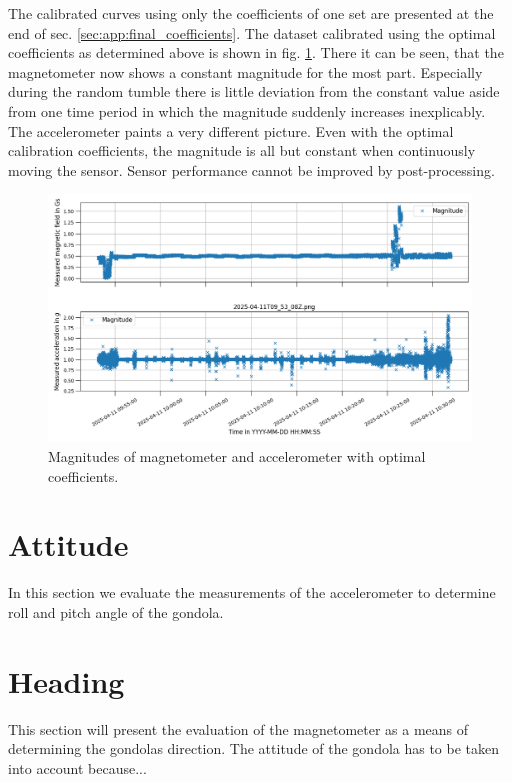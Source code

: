 The calibrated curves using only the coefficients of one set are presented at the end of sec. \ref{sec:app:final_coefficients}. The dataset calibrated using the optimal coefficients as determined above is shown in fig. \ref{fig:res:optimal_coeff_magnitude}. There it can be seen, that the magnetometer now shows a constant magnitude for the most part. Especially during the random tumble there is little deviation from the constant value aside from one time period in which the magnitude suddenly increases inexplicably.\\
The accelerometer paints a very different picture. Even with the optimal calibration coefficients, the magnitude is all but constant when continuously moving the sensor. Sensor performance cannot be improved by post-processing.  
\begin{figure}[H]
    \centering
    \includegraphics[width=\linewidth]{images/04_results/optimal_calibrated_11apr_magnitude.png}
    \caption{Magnitudes of magnetometer and accelerometer with optimal coefficients.}
    \label{fig:res:optimal_coeff_magnitude}
\end{figure}



\section{Attitude \label{sec:res:attitude}}
In this section we evaluate the measurements of the accelerometer to determine roll and pitch angle of the gondola.

\section{Heading \label{sec:res:heading}}
This section will present the evaluation of the magnetometer as a means of determining the gondolas direction. The attitude of the gondola has to be taken into account because...